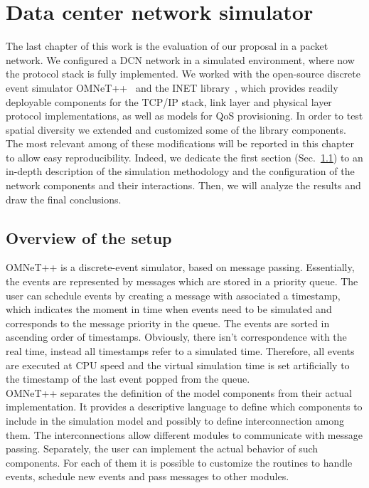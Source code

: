 \chapter{Data center network simulator}
\label{ch:dcn-simulations}
The last chapter of this work is the evaluation of our proposal in a packet network. We configured a DCN network in a simulated environment, where now the protocol stack is fully implemented. We worked with the open-source discrete event simulator OMNeT++~\cite{omnetpp} and the INET library~\cite{inet}, which provides readily deployable components for the TCP/IP stack, link layer and physical layer protocol implementations, as well as models for QoS provisioning. In order to test spatial diversity we extended and customized some of the library components. The most relevant among of these modifications will be reported in this chapter to allow easy reproducibility. Indeed, we dedicate the first section (Sec.~\ref{sec:opp-setup}) to an in-depth description of the simulation methodology and the configuration of the network components and their interactions. Then, we will analyze the results and draw the final conclusions. 
\section{Overview of the setup}
\label{sec:opp-setup}
OMNeT++ is a discrete-event simulator, based on message passing. Essentially, the events are represented by messages which are stored in a priority queue. The user can schedule events by creating a message with associated a timestamp, which indicates the moment in time when events need to be simulated and corresponds to the message priority in the queue.  The events are sorted in ascending order of timestamps.  Obviously, there isn't correspondence with the real time, instead all timestamps refer to a simulated time. Therefore, all events are executed at CPU speed and the virtual simulation time is set artificially to the timestamp of the last event popped from the queue. \\ OMNeT++ separates the definition of the model components from their actual implementation. It provides a descriptive language to define which components to include in the simulation model and possibly to define interconnection among them. The interconnections allow different modules to communicate with message passing. Separately, the user can implement the actual behavior of such components. For each of them it is possible to customize the routines to handle events, schedule new events and pass messages to other modules.

